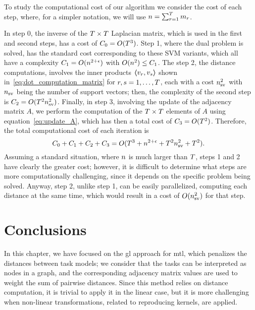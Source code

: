 To study the computational cost of our algorithm we consider the cost of each step, where, for a simpler notation, we will use $n = \sum_{r=1}^T m_r$.

In step 0, the inverse of the $T \times T$ Laplacian matrix, which is used in the first and second steps, has a cost of $C_0 = O(T^3)$.
%
Step 1, where the dual problem is solved, has the standard cost corresponding to these SVM variants, which all have a complexity $C_1 = O(n^{2+\epsilon})$ with $O(n^2) \leq C_1$.
%
The step 2, the distance computations, involves the inner products $\bm{\left\langle} v_r, v_s \bm{\right\rangle}$ shown in~\eqref{eq:dot_computation_matrix} for $r,s=1, \ldots, T$, each with a cost $n_{\text{sv}}^2$ with $n_{\text{sv}}$ being the number of support vectors; then, the complexity of the second step is $C_2 = O(T^2 n_\text{sv}^2)$.
%
Finally, in step 3, involving the update of the adjacency matrix $A$, we perform the computation of the $T \times T$ elements of $A$ using equation~\eqref{eq:update_A}, which has then a total cost of $C_3 = O(T^2)$.
%
Therefore, the total computational cost of each iteration is
$$ C_0 + C_1 + C_2 + C_3 = O(T^3 + n^{2+\epsilon} + T^2 n_\text{sv}^2 + T^2) .$$
%
Assuming a standard situation, where $n$ is much larger than $T$, steps 1 and 2 have clearly the greater cost; however, it is difficult to determine what steps are more computationally challenging, since it depends on the specific problem being solved. Anyway, step 2, unlike step 1, can be easily parallelized, computing each distance at the same time, which would result in a cost of $O(n_\text{sv}^2)$ for that step.




\section{Conclusions}\label{sec-conclusions-4}

In this chapter, we have focused on the \acrshort{gl} approach for \acrshort{mtl}, which penalizes the distances between task models; we consider that the tasks can be interpreted as nodes in a graph, and the corresponding adjacency matrix values are used to weight the sum of pairwise distances.
%
Since this method relies on distance computation, it is trivial to apply it in the linear case, but it is more challenging when non-linear transformations, related to reproducing kernels, are applied.

